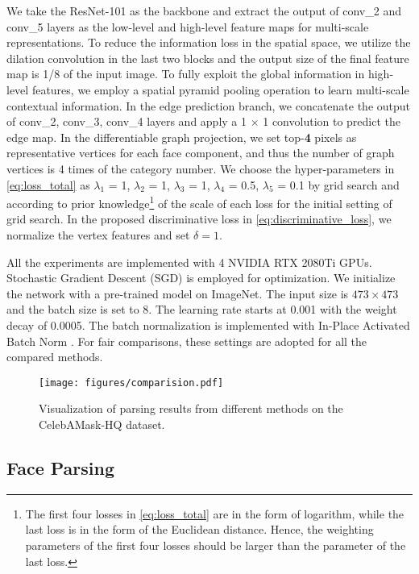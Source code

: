 We take the ResNet-101\cite{he2016deep} as the backbone and extract the output of conv\_2 and conv\_5 layers as the low-level and high-level feature maps for multi-scale representations. 
To reduce the information loss in the spatial space, we utilize the dilation convolution in the last two blocks and the output size of the final feature map is 1/8 of the input image. 
To fully exploit the global information in high-level features, we employ a spatial pyramid pooling operation \cite{zhao2017pyramid} to learn multi-scale contextual information. 
In the edge prediction branch, we concatenate the output of conv\_2, conv\_3, conv\_4 layers and apply a 1 $\times$ 1 convolution to predict the edge map. 
In the differentiable graph projection, we set top-\textbf{4} pixels as representative vertices for each face component, and thus the number of graph vertices is 4 times of the category number. 
We choose the hyper-parameters in \eqref{eq:loss_total} as $\lambda_1$ = 1, $\lambda_2$ = 1, $\lambda_3$ = 1, $\lambda_4$ = 0.5, $\lambda_5$ = 0.1 by grid search and according to prior knowledge\footnote{The first four losses in \eqref{eq:loss_total} are in the form of logarithm, while the last loss is in the form of the Euclidean distance. Hence, the weighting parameters of the first four losses should be larger than the parameter of the last loss.} of the scale of each loss for the initial setting of grid search.
In the proposed discriminative loss in \eqref{eq:discriminative_loss}, we normalize the vertex features and set $\delta=1$.

All the experiments are implemented with 4 NVIDIA RTX 2080Ti GPUs. Stochastic Gradient Descent (SGD) is employed for optimization. We initialize the network with a pre-trained model on ImageNet. The input size is $473 \times 473$ and the batch size is set to 8. The learning rate starts at 0.001 with the weight decay of 0.0005. 
The batch normalization is implemented with In-Place Activated Batch Norm \cite{rotabulo2017place}.  For fair comparisons, these settings are adopted for all the compared methods.

\begin{figure*}[tbp]
    \centering
    \texttt{[image: figures/comparision.pdf]}
\caption{Visualization of parsing results from different methods on the CelebAMask-HQ dataset.}
    \label{fig:comparison}
\end{figure*}

\subsection{Face Parsing}

